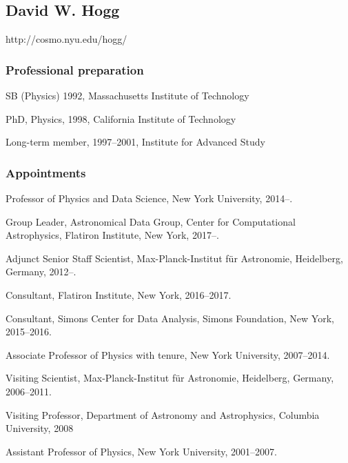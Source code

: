 \documentclass[12pt, fullpage, letterpaper]{article}
\begin{document}
\subsection*{David W. Hogg}
\noindent http://cosmo.nyu.edu/hogg/

\subsubsection*{Professional preparation}
\begin{list}{}{\hogglist}
\item
SB (Physics) 1992, Massachusetts Institute of Technology
\item
PhD, Physics, 1998, California Institute of Technology
\item
Long-term member, 1997--2001, Institute for Advanced Study
\end{list}

\subsubsection*{Appointments}
\begin{list}{}{\hogglist}
\item
{} Professor of Physics and Data Science, New York University, 2014--.
\item
{} Group Leader, Astronomical Data Group, Center for Computational Astrophysics,
Flatiron Institute, New York, 2017--.
\item
{} Adjunct Senior Staff Scientist, Max-Planck-Institut f\"ur Astronomie,
Heidelberg, Germany, 2012--.
\item
Consultant, Flatiron Institute, New York, 2016--2017.
\item
Consultant, Simons Center for Data Analysis,
Simons Foundation, New York, 2015--2016.
\item
Associate Professor of Physics with tenure, New York University, 2007--2014.
\item
Visiting Scientist, Max-Planck-Institut f\"ur Astronomie,
Heidelberg, Germany, 2006--2011.
\item
Visiting Professor, Department of Astronomy and Astrophysics, Columbia
University, 2008
\item
Assistant Professor of Physics, New York University, 2001--2007.
\end{list}
\end{document}
